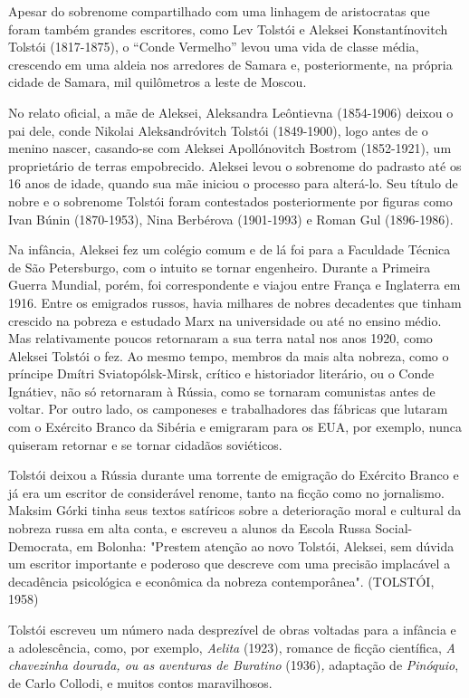 \documentclass{article}
\begin{document}
Apesar do sobrenome compartilhado com uma linhagem de aristocratas que
foram também grandes escritores, como Lev Tolstói e Aleksei
Konstantínovitch Tolstói (1817-1875), o ``Conde Vermelho'' levou uma
vida de classe média, crescendo em uma aldeia nos arredores de Samara e,
posteriormente, na própria cidade de Samara, mil quilômetros a leste de
Moscou.

No relato oficial, a mãe de Aleksei, Aleksandra Leôntievna (1854-1906)
deixou o pai dele, conde Nikolai Aleksаndróvitch Tolstói (1849-1900),
logo antes de o menino nascer, casando-se com Aleksei Apollónovitch
Bostrom (1852-1921), um proprietário de terras empobrecido. Aleksei
levou o sobrenome do padrasto até os 16 anos de idade, quando sua mãe
iniciou o processo para alterá-lo. Seu título de nobre e o sobrenome
Tolstói foram contestados posteriormente por figuras como Ivan Búnin
(1870-1953), Nina Berbérova (1901-1993) e Roman Gul (1896-1986).

Na infância, Aleksei fez um
colégio comum e de lá foi para a Faculdade Técnica de São Petersburgo,
com o intuito se tornar engenheiro. Durante a Primeira Guerra Mundial,
porém, foi correspondente e viajou entre França e Inglaterra em
1916. Entre os emigrados russos,
havia milhares de nobres decadentes que tinham crescido na pobreza e
estudado Marx na universidade ou até no ensino médio. Mas relativamente
poucos retornaram a sua terra natal nos anos 1920, como Aleksei Tolstói
o fez. Ao mesmo tempo, membros da mais alta nobreza, como o príncipe
Dmítri Sviatopólsk-Mirsk, crítico e historiador literário, ou o Conde
Ignátiev, não só retornaram à Rússia, como se tornaram comunistas antes
de voltar. Por outro lado, os camponeses e trabalhadores das fábricas
que lutaram com o Exército Branco da Sibéria e emigraram para os EUA,
por exemplo, nunca quiseram retornar e se tornar cidadãos soviéticos.

Tolstói deixou a Rússia durante uma torrente de emigração do Exército
Branco e já era um escritor de considerável renome, tanto na ficção como
no jornalismo. Maksim Górki tinha seus textos satíricos sobre a
deterioração moral e cultural da nobreza russa em alta conta, e escreveu
a alunos da Escola Russa Social-Democrata, em Bolonha: "Prestem atenção
ao novo Tolstói, Aleksei, sem dúvida um escritor importante e poderoso
que descreve com uma precisão implacável a decadência psicológica e
econômica da nobreza contemporânea". (TOLSTÓI, 1958)

Tolstói escreveu um número nada desprezível de obras voltadas para a
infância e a adolescência, como, por exemplo, \emph{Aelita} (1923),
romance de ficção científica, \emph{A chavezinha dourada, ou as
aventuras de Buratino} (1936)\emph{,} adaptação de \emph{Pinóquio}, de
Carlo Collodi, e muitos contos maravilhosos.
\end{document}
